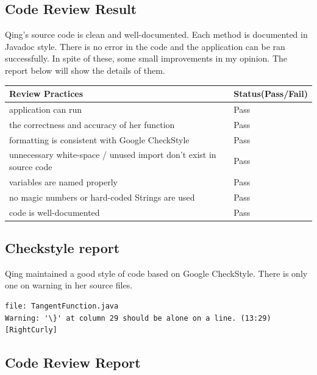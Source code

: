 \documentclass[10pt]{article}
\begin{document}
\subsection{Code Review Result}
Qing's source code is clean and well-documented. Each method is documented in Javadoc style. There is no error in the code and the application can be ran successfully. In spite of these, some small improvements in my opinion. The report below will show the details of them.

\begin{table}[h!]
\begin{tabular}{|l|l|}
\hline
Review Practices                                                    & Status(Pass/Fail) \\ \hline
application can run                                                & Pass              \\ \hline
the correctness and accuracy of her function                       & Pass              \\ \hline
formatting is consistent with Google CheckStyle                    & Pass              \\ \hline
unnecessary white-space / unused import don't exist in source code & Pass              \\ \hline
variables are named properly                                       & Pass              \\ \hline
no magic numbers or hard-coded Strings are used                    & Pass              \\ \hline
code is well-documented                                            & Pass              \\ \hline
\end{tabular}
\end{table}

\subsection{Checkstyle report}
Qing maintained a good style of code based on Google CheckStyle. There is only one on warning in her source files.

\begin{verbatim}
file: TangentFunction.java
Warning: '\}' at column 29 should be alone on a line. (13:29) [RightCurly]
\end{verbatim}

\subsection{Code Review Report}

\end{document}
